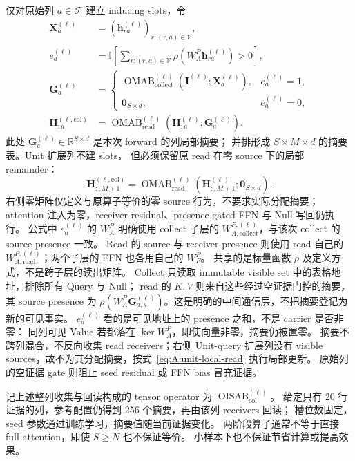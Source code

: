 \documentclass[11pt,UTF8,fontset=fandol]{ctexart}
\numberwithin{equation}{section}
\theoremstyle{definition}
\newcommand{\Fset}{\mathcal F}
\newcommand{\Vset}{\mathcal V}
\newcommand{\R}{\mathbb R}
\newcommand{\ind}{\mathbb I}
\newcommand{\OMAB}{\operatorname{OMAB}}
\begin{document}
仅对原始列 $a\in\Fset$ 建立 inducing slots，令
\begin{equation}
 \begin{aligned}
  \bm X_a^{(\ell)}&=(\bm h_{ra}^{(\ell)})_{r:(r,a)\in\Vset},\\
  e_a^{(\ell)}&=\ind\!\left[\sum_{r:(r,a)\in\Vset}
                                  \rho(W_A^{P}\bm h_{ra}^{(\ell)})>0\right],\\
  \bm G_a^{(\ell)}&=
   \begin{cases}
    \OMAB_{\mathrm{collect}}^{(\ell)}
       (\bm I^{(\ell)};\bm X_a^{(\ell)}),&e_a^{(\ell)}=1,\\
    \bm0_{S\times d},&e_a^{(\ell)}=0,
   \end{cases}\\
  \bm H_{:a}^{(\ell,\mathrm{col})}
    &=\OMAB_{\mathrm{read}}^{(\ell)}
       (\bm H_{:a}^{(\ell)};\bm G_a^{(\ell)}).
 \end{aligned}
 \label{eq:A:inducing-column}
\end{equation}
此处 $\bm G_a^{(\ell)}\in\R^{S\times d}$ 是本次 forward 的列局部摘要；
并排形成 $S\times M\times d$ 的摘要表。Unit 扩展列不建 slots，
但必须保留原 read 在零 source 下的局部 remainder：
\begin{equation}
 \bm H_{:,M+1}^{(\ell,\mathrm{col})}
 =\OMAB_{\mathrm{read}}^{(\ell)}
   (\bm H_{:,M+1}^{(\ell)};\bm0_{S\times d}).
 \label{eq:A:unit-local-read}
\end{equation}
右侧零矩阵仅定义与原算子等价的零 source 行为，不要求实际分配摘要；
attention 注入为零，receiver residual、presence-gated FFN 与 Null 写回仍执行。
公式中 $e_a^{(\ell)}$ 的 $W_A^P$ 明确使用 collect 子层的
$W_{A,\mathrm{collect}}^{P,(\ell)}$，与该次 collect 的 source presence 一致。
Read 的 source 与 receiver presence 则使用 read 自己的
$W_{A,\mathrm{read}}^{P,(\ell)}$；两个子层的 FFN 也各用自己的 $W_F^P$。
共享的是标量函数 $\rho$ 及定义方式，不是跨子层的读出矩阵。
Collect 只读取 immutable visible set 中的表格地址，排除所有 Query 与 Null；
read 的 $K,V$ 则来自这些经过空证据门控的摘要，其 source presence 为
$\rho(W_A^{P}\bm G_{a,s}^{(\ell)})$。这是明确的中间通信层，不把摘要登记为新的可见事实。
$e_a^{(\ell)}$ 看的是可见地址上的 presence 之和，不是 carrier 是否非零：
同列可见 Value 若都落在 $\ker W_A^{P}$，即使向量非零，摘要仍被置零。
摘要不跨列混合，不反向收集 read receivers；右侧 Unit-query 扩展列没有 visible
sources，故不为其分配摘要，按式~\eqref{eq:A:unit-local-read} 执行局部更新。
原始列的空证据 gate 则阻止 seed residual 或 FFN bias 冒充证据。

记上述整列收集与回读构成的 tensor operator 为
$\operatorname{OISAB}_{\mathrm{col}}^{(\ell)}$。
给定只有 20 行证据的列，参考配置仍得到 256 个摘要，再由该列 receivers 回读；
槽位数固定，seed 参数通过训练学习，摘要值随当前证据变化。
两阶段算子通常不等于直接 full attention，即使 $S\geq N$ 也不保证等价。
小样本下也不保证节省计算或提高效果。
\end{document}
